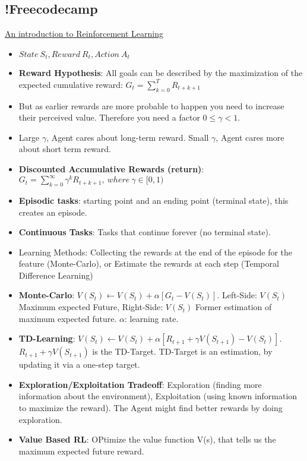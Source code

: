 \subsection{!Freecodecamp}
\href{https://www.freecodecamp.org/news/an-introduction-to-reinforcement-learning-4339519de419/}{An introduction to Reinforcement Learning}
\begin{itemize}[noitemsep,nolistsep]
	\item $State\ S_t, Reward\ R_t, Action\ A_t$
	\item \textbf{Reward Hypothesis}: All goals can be described by the maximization of the expected cumulative reward: $G_t = \sum_{k=0}^T R_{t+k+1}$
	\item But as earlier rewards are more probable to happen you need to increase their perceived value. Therefore you need a factor $0 \leq \gamma < 1$.
	\item Large $\gamma$, Agent cares about long-term reward. Small $\gamma$, Agent cares more about short term reward.
	\item \textbf{Discounted Accumulative Rewards (return)}: $G_t = \sum_{k=0}^\infty \gamma^k R_{t+k+1},\ where\ \gamma \in [0,1)$ 
	\item \textbf{Episodic tasks}: starting point and an ending point (terminal state), this creates an episode.
	\item \textbf{Continuous Tasks}: Tasks that continue forever (no terminal state).
	\item Learning Methods: Collecting the rewards at the end of the episode for the feature (Monte-Carlo), or Estimate the rewards at each step (Temporal Difference Learning)
	\item \textbf{Monte-Carlo}: $V(S_t) \leftarrow V(S_t) + \alpha [G_t - V(S_t)]$. Left-Side: $V(S_t)$ Maximum expected Future, Right-Side: $V(S_t)$ Former estimation of maximum expected future. $\alpha$: learning rate.
	\item \textbf{TD-Learning}: $V(S_t) \leftarrow V(S_t) + \alpha [R_{t+1} + \gamma V(S_{t+1}) - V(S_t)]$. $R_{t+1} + \gamma V(S_{t+1})$ is the TD-Target. TD-Target is an estimation, by updating it via a one-step target.
	\item \textbf{Exploration/Exploitation Tradeoff}: Exploration (finding more information about the environment), Exploitation (using known information to maximize the reward). The Agent might find better rewards by doing exploration.
	\item \textbf{Value Based RL}: OPtimize the value function V(s), that tells us the maximum expected future reward.

\end{itemize}
